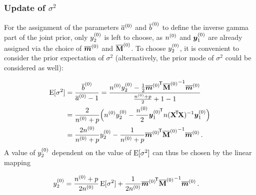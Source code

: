 \subsubsection{Update of \texorpdfstring{$\sigma^2$}{sigma2}}
\label{sec:cccp-update2}

For the assignment of the parameters $\taz$ and $\tbz$ to define the inverse gamma part
of the joint prior, only $\yz_2$ is left to choose,
as $\nz$ and $\byz_1$ are already assigned via the choice of $\tmz$ and $\tMz$.
To choose $\yz_2$, it is convenient to consider the prior expectation of $\sigma^2$
(alternatively, the prior mode of $\sigma^2$ could be considered as well):

\begin{align*}
\E[\sigma^2] &= \frac{\tbz}{\taz - 1}
              = \frac{\nz \yz_2 -\frac{1}{2} {\tmz}^\tra {\tMz}^{-1}\tmz}{\frac{\nz + p}{2}+1-1} \\
             &= \frac{2}{\nz + p}\Big(\nz \yz_2 -\frac{\nz}{2} {\byz_1}^\tra n(\XtX)^{-1} \byz_1\Big) \\
             &= \frac{2 \nz}{\nz + p} \yz_2 - \frac{1}{\nz + p} {\tmz}^\tra {\tMz}^{-1}\tmz\,.
\end{align*}
A value of $\yz_2$ dependent on the value of $\E[\sigma^2]$ can thus be chosen by the linear mapping

\begin{align*}
\yz_2 &= \frac{\nz + p}{2 \nz} \E[\sigma^2] + \frac{1}{2\nz} {\tmz}^\tra {\tMz}^{-1}\tmz\,.
\end{align*}
%


